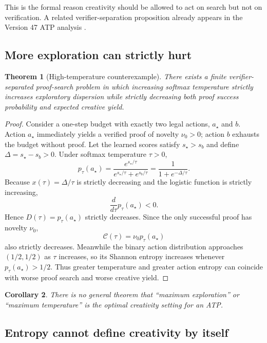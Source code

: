 \documentclass[11pt]{article}
\theoremstyle{datatheorem}
\newtheorem{theorem}{Theorem}[section]
\newtheorem{corollary}[theorem]{Corollary}
\theoremstyle{definition}
\newcommand{\cY}{\mathcal{C}}
\begin{document}
This is the formal reason creativity should be allowed to act on search but not on verification. A related verifier-separation proposition already appears in the Version 47 ATP analysis \cite{tennesonDepths47}.

\subsection{More exploration can strictly hurt}

\begin{theorem}[High-temperature counterexample]\label{thm:temperature}
There exists a finite verifier-separated proof-search problem in which increasing softmax temperature strictly increases exploratory dispersion while strictly decreasing both proof success probability and expected creative yield.
\end{theorem}

\begin{proof}
Consider a one-step budget with exactly two legal actions, $a_\star$ and $b$. Action $a_\star$ immediately yields a verified proof of novelty $\nu_0>0$; action $b$ exhausts the budget without proof. Let the learned scores satisfy $s_\star>s_b$ and define $\Delta=s_\star-s_b>0$. Under softmax temperature $\tau>0$,
\[
p_\tau(a_\star)=\frac{e^{s_\star/\tau}}{e^{s_\star/\tau}+e^{s_b/\tau}}
=\frac{1}{1+e^{-\Delta/\tau}}.
\]
Because $x(\tau)=\Delta/\tau$ is strictly decreasing and the logistic function is strictly increasing,
\[
\frac{d}{d\tau}p_\tau(a_\star)<0.
\]
Hence $D(\tau)=p_\tau(a_\star)$ strictly decreases. Since the only successful proof has novelty $\nu_0$,
\[
\cY(\tau)=\nu_0p_\tau(a_\star)
\]
also strictly decreases. Meanwhile the binary action distribution approaches $(1/2,1/2)$ as $\tau$ increases, so its Shannon entropy increases whenever $p_\tau(a_\star)>1/2$. Thus greater temperature and greater action entropy can coincide with worse proof search and worse creative yield.
\end{proof}

\begin{corollary}
There is no general theorem that ``maximum exploration'' or ``maximum temperature'' is the optimal creativity setting for an ATP.
\end{corollary}

\subsection{Entropy cannot define creativity by itself}
\end{document}
